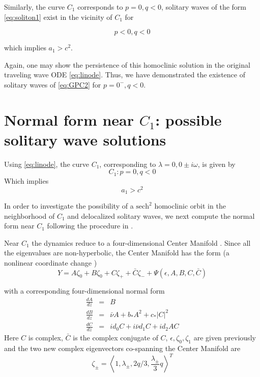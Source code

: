 Similarly, the curve $C_1$ corresponds to $p=0,q<0$, solitary waves of the form \eqref{eq:soliton1} exist
in the vicinity of $C_1$ for 

\begin{equation}
p < 0, q < 0 
\end{equation}

which implies $ a_1 > c^2 $.

Again, one may show the persistence
of this homoclinic solution in the original traveling wave ODE \eqref{eq:linode}. Thus, we have 
demonstrated the existence of solitary waves of \eqref{eq:GPC2} for $p=0^-, q<0$.


\section{Normal form near $C_1$: possible solitary wave solutions}
Using \eqref{eq:linode}, the curve $C_1$, corresponding to $\lambda = 0, 0\pm i \omega$, is given by
\begin{equation}\label{eq:c1}
C_1 : { p = 0, q < 0 }
\end{equation}
Which implies
\begin{equation}
a_1 > c^2
\end{equation}

In order to investigate the possibility of a $ \mathrm{sech}^2 $  homoclinic orbit in the neighborhood of $C_1$ and delocalized solitary
waves, we next compute the normal form near $C_1$ following the procedure in \cite{IA}.

Near $C_1$ the dynamics reduce to a four-dimensional Center Manifold \cite{IA}.
Since all the eigenvalues are non-hyperbolic, the Center Manifold has the form (a nonlinear coordinate change \cite{IA})
\begin{equation} \label{eq:c1cm}
Y = A \zeta_0 + B \zeta_0 + C \zeta_+ + \bar{C} \zeta_- + \Psi(\epsilon,A,B,C,\bar{C})
\end{equation}

with  a corresponding four-dimensional normal form
\begin{subequations}\label{eq:c1nf}
\begin{eqnarray}
\frac{dA}{dz} &=& B  \label{eq:c1nfa} \\
\frac{dB}{dz} &=& \bar{\nu} A + b_* A^2 + c_* \left|C\right|^2  \label{eq:c1nfb} \\
\frac{dC}{dz} &=& i d_0 C + i \bar{\nu} d_1 C + i d_2 A C \label{eq:c1nfc}
\end{eqnarray}
\end{subequations}
Here $C$ is complex, $\bar{C}$ is the complex conjugate of $C$, $\epsilon, \zeta_0, \zeta_1$ are given previously and the two new
complex eigenvectors co-spanning the Center Manifold are
\begin{equation}
\zeta_\pm	 = \left< 1, \lambda_\pm, 2 q / 3, \frac{\lambda_\pm}{3} q\right>^T 
\end{equation}

